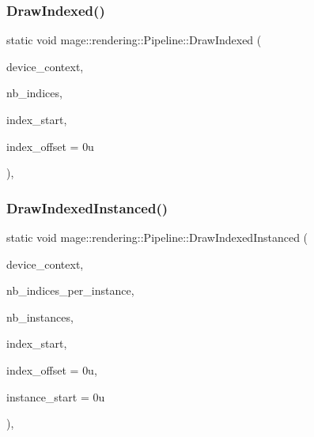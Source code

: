 \subsubsection{\texorpdfstring{Draw\+Indexed()}{DrawIndexed()}}
{\footnotesize\ttfamily static void mage\+::rendering\+::\+Pipeline\+::\+Draw\+Indexed (\begin{DoxyParamCaption}\item[{I\+D3\+D11\+Device\+Context \&}]{device\+\_\+context,  }\item[{\mbox{\hyperlink{namespacemage_aa5d6eaabaac3cdd01873d6a3d27e90f3}{U32}}}]{nb\+\_\+indices,  }\item[{\mbox{\hyperlink{namespacemage_aa5d6eaabaac3cdd01873d6a3d27e90f3}{U32}}}]{index\+\_\+start,  }\item[{\mbox{\hyperlink{namespacemage_aa5d6eaabaac3cdd01873d6a3d27e90f3}{U32}}}]{index\+\_\+offset = {\ttfamily 0u} }\end{DoxyParamCaption})\hspace{0.3cm}{\ttfamily [static]}, {\ttfamily [noexcept]}}

\mbox{\label{structmage_1_1rendering_1_1_pipeline_a23ab5aea07be3bca0d9d7900518104b7}} 
\subsubsection{\texorpdfstring{Draw\+Indexed\+Instanced()}{DrawIndexedInstanced()}}
{\footnotesize\ttfamily static void mage\+::rendering\+::\+Pipeline\+::\+Draw\+Indexed\+Instanced (\begin{DoxyParamCaption}\item[{I\+D3\+D11\+Device\+Context \&}]{device\+\_\+context,  }\item[{\mbox{\hyperlink{namespacemage_aa5d6eaabaac3cdd01873d6a3d27e90f3}{U32}}}]{nb\+\_\+indices\+\_\+per\+\_\+instance,  }\item[{\mbox{\hyperlink{namespacemage_aa5d6eaabaac3cdd01873d6a3d27e90f3}{U32}}}]{nb\+\_\+instances,  }\item[{\mbox{\hyperlink{namespacemage_aa5d6eaabaac3cdd01873d6a3d27e90f3}{U32}}}]{index\+\_\+start,  }\item[{\mbox{\hyperlink{namespacemage_aa5d6eaabaac3cdd01873d6a3d27e90f3}{U32}}}]{index\+\_\+offset = {\ttfamily 0u},  }\item[{\mbox{\hyperlink{namespacemage_aa5d6eaabaac3cdd01873d6a3d27e90f3}{U32}}}]{instance\+\_\+start = {\ttfamily 0u} }\end{DoxyParamCaption})\hspace{0.3cm}{\ttfamily [static]}, {\ttfamily [noexcept]}}

